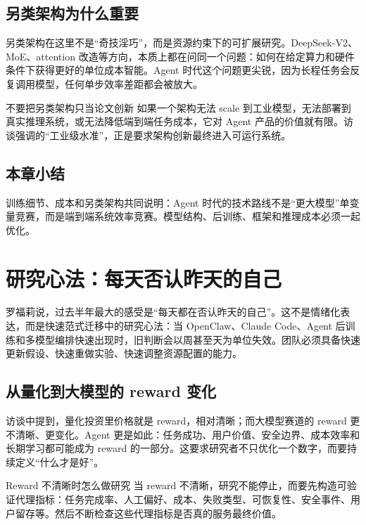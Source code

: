\documentclass[a4paper]{article}
\begin{document}
\subsection{另类架构为什么重要}

另类架构在这里不是“奇技淫巧”，而是资源约束下的可扩展研究。DeepSeek-V2、MoE、attention 改造等方向，本质上都在问同一个问题：如何在给定算力和硬件条件下获得更好的单位成本智能。Agent 时代这个问题更尖锐，因为长程任务会反复调用模型，任何单步效率差距都会被放大。

\begin{warningbox}{不要把另类架构只当论文创新}
如果一个架构无法 scale 到工业模型，无法部署到真实推理系统，或无法降低端到端任务成本，它对 Agent 产品的价值就有限。访谈强调的“工业级水准”，正是要求架构创新最终进入可运行系统。
\end{warningbox}

\subsection{本章小结}

训练细节、成本和另类架构共同说明：Agent 时代的技术路线不是“更大模型”单变量竞赛，而是端到端系统效率竞赛。模型结构、后训练、框架和推理成本必须一起优化。

\section{研究心法：每天否认昨天的自己}

罗福莉说，过去半年最大的感受是“每天都在否认昨天的自己”。这不是情绪化表达，而是快速范式迁移中的研究心法：当 OpenClaw、Claude Code、Agent 后训练和多模型编排快速出现时，旧判断会以周甚至天为单位失效。团队必须具备快速更新假设、快速重做实验、快速调整资源配置的能力。

\subsection{从量化到大模型的 reward 变化}

访谈中提到，量化投资里价格就是 reward，相对清晰；而大模型赛道的 reward 更不清晰、更变化。Agent 更是如此：任务成功、用户价值、安全边界、成本效率和长期学习都可能成为 reward 的一部分。这要求研究者不只优化一个数字，而要持续定义“什么才是好”。

\begin{knowledgebox}{Reward 不清晰时怎么做研究}
当 reward 不清晰，研究不能停止，而要先构造可验证代理指标：任务完成率、人工偏好、成本、失败类型、可恢复性、安全事件、用户留存等。然后不断检查这些代理指标是否真的服务最终价值。
\end{knowledgebox}
\end{document}
